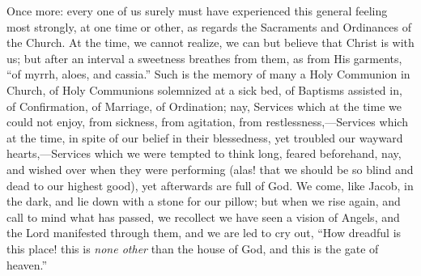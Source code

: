 Once more: every one of us surely must have experienced this
general feeling most strongly, at one time or other, as regards the
Sacraments and Ordinances of the Church. At the time, we cannot
realize, we can but believe that Christ is with us; but after an
interval a sweetness breathes from them, as from His garments,
``of myrrh, aloes, and cassia.'' Such is the memory of many a
Holy Communion in Church, of Holy Communions solemnized at a sick bed,
of Baptisms assisted in, of Confirmation, of Marriage, of Ordination;
nay, Services which at the time we could not enjoy, from sickness,
from agitation, from restlessness,—Services which at the time, in
spite of our belief in their blessedness, yet troubled our wayward
hearts,—Services which we were tempted to think long, feared
beforehand, nay, and wished over when they were performing (alas! that
we should be so blind and dead to our highest good), yet afterwards
are full of God. We come, like Jacob, in the dark, and lie down with a
stone for our pillow; but when we rise again, and call to mind what
has passed, we recollect we have seen a vision of Angels, and the Lord
manifested through them, and we are led to cry out, ``How dreadful
is this place! this is \emph{none other} than the house of God, and
this is the gate of heaven.''

